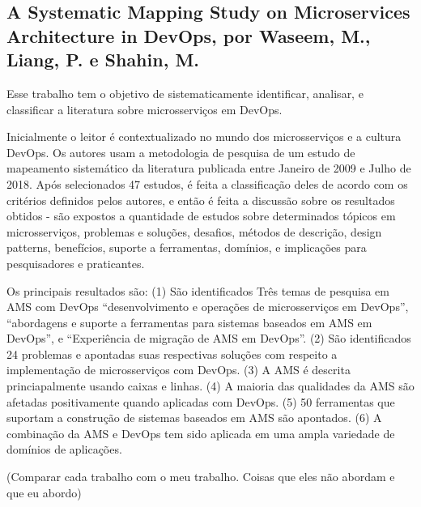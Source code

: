 \subsection{A Systematic Mapping Study on Microservices Architecture in DevOps, por Waseem, M., Liang, P. e Shahin, M.}

Esse trabalho tem o objetivo de sistematicamente identificar, analisar, e classificar a literatura sobre microsserviços em DevOps.

Inicialmente o leitor é contextualizado no mundo dos microsserviços e a cultura DevOps. Os autores usam a metodologia de pesquisa de um estudo de mapeamento sistemático da literatura publicada entre Janeiro de 2009 e Julho de 2018. Após selecionados 47 estudos, é feita a classificação deles de acordo com os critérios definidos pelos autores, e então é feita a discussão sobre os resultados obtidos - são expostos a quantidade de estudos sobre determinados tópicos em microsserviços, problemas e soluções, desafios, métodos de descrição, design patterns, benefícios, suporte a ferramentas, domínios, e implicações para pesquisadores e praticantes.

Os principais resultados são: (1) São identificados Três temas de pesquisa em AMS com DevOps “desenvolvimento e operações de microsserviços em DevOps”, “abordagens e suporte a ferramentas para sistemas baseados em AMS em DevOps”, e “Experiência de migração de AMS em DevOps”. (2) São identificados 24 problemas e apontadas suas respectivas soluções com respeito a implementação de microsserviços com DevOps. (3) A AMS é descrita princiapalmente usando caixas e linhas. (4) A maioria das qualidades da AMS são afetadas positivamente quando aplicadas com DevOps. (5) 50 ferramentas que suportam a construção de sistemas baseados em AMS são apontados. (6) A combinação da AMS e DevOps tem sido aplicada em uma ampla variedade de domínios de aplicações.


(Comparar cada trabalho com o meu trabalho. Coisas que eles não abordam e que eu abordo)
